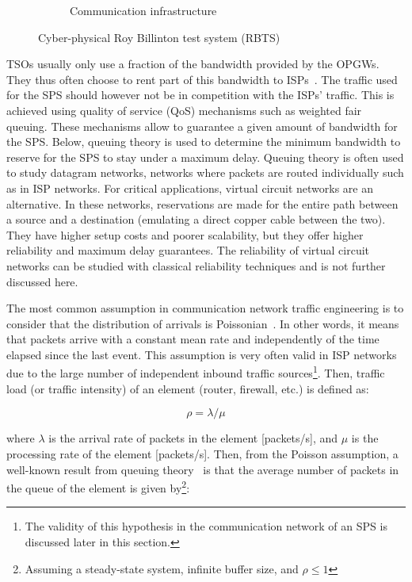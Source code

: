 \begin{figure}
\begin{subfigure}[b]{0.47\textwidth}
         \caption{Communication infrastructure}
         \label{fig:RBTS-cyber}
     \end{subfigure}
\caption{Cyber-physical Roy Billinton test system (RBTS)}
\label{fig:RBTS}
\end{figure}

TSOs usually only use a fraction of the bandwidth provided by the OPGWs. They thus often choose to rent part of this bandwidth to ISPs~\cite[p110]{bookUK_OPGW}. The traffic used for the SPS should however not be in competition with the ISPs' traffic. This is achieved using quality of service (QoS) mechanisms such as weighted fair queuing. These mechanisms allow to guarantee a given amount of bandwidth for the SPS. Below, queuing theory is used to determine the minimum bandwidth to reserve for the SPS to stay under a maximum delay. Queuing theory is often used to study datagram networks, \ie networks where packets are routed individually such as in ISP networks. For critical applications, virtual circuit networks are an alternative. In these networks, reservations are made for the entire path between a source and a destination (emulating a direct copper cable between the two). They have higher setup costs and poorer scalability, but they offer higher reliability and maximum delay guarantees. The reliability of virtual circuit networks can be studied with classical reliability techniques and is not further discussed here.

The most common assumption in communication network traffic engineering is to consider that the distribution of arrivals is Poissonian~\cite{trafficBook}. In other words, it means that packets arrive with a constant mean rate and independently of the time elapsed since the last event. This assumption is very often valid in ISP networks due to the large number of independent inbound traffic sources\footnote{The validity of this hypothesis in the communication network of an SPS is discussed later in this section.}. Then, traffic load (or traffic intensity) of an element (router, firewall, etc.) is defined as:

\begin{equation}
\rho = \lambda/\mu
\end{equation}

\noindent where \(\lambda\) is the arrival rate of packets in the element [packets/s], and \(\mu\) is the processing rate of the element [packets/s]. Then, from the Poisson assumption, a well-known result from queuing theory~\cite{trafficBook} is that the average number of packets in the queue of the element is given by\footnote{Assuming a steady-state system, infinite buffer size, and \(\rho \leq 1\)}:

